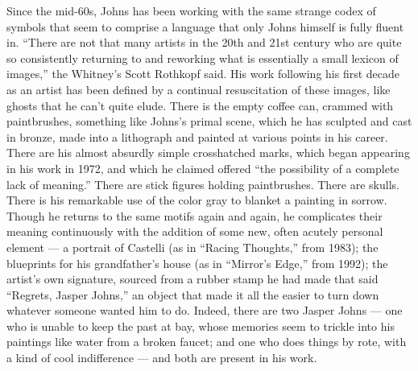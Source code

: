 Since the mid-60s, Johns has been working with the same strange codex of
symbols that seem to comprise a language that only Johns himself is
fully fluent in. ``There are not that many artists in the 20th and 21st
century who are quite so consistently returning to and reworking what is
essentially a small lexicon of images,'' the Whitney's Scott Rothkopf
said. His work following his first decade as an artist has been defined
by a continual resuscitation of these images, like ghosts that he can't
quite elude. There is the empty coffee can, crammed with paintbrushes,
something like Johns's primal scene, which he has sculpted and cast in
bronze, made into a lithograph and painted at various points in his
career. There are his almost absurdly simple crosshatched marks, which
began appearing in his work in 1972, and which he claimed offered ``the
possibility of a complete lack of meaning.'' There are stick figures
holding paintbrushes. There are skulls. There is his remarkable use of
the color gray to blanket a painting in sorrow. Though he returns to the
same motifs again and again, he complicates their meaning continuously
with the addition of some new, often acutely personal element --- a
portrait of Castelli (as in ``Racing Thoughts,'' from 1983); the
blueprints for his grandfather's house (as in ``Mirror's Edge,'' from
1992); the artist's own signature, sourced from a rubber stamp he had
made that said ``Regrets, Jasper Johns,'' an object that made it all the
easier to turn down whatever someone wanted him to do. Indeed, there are
two Jasper Johns --- one who is unable to keep the past at bay, whose
memories seem to trickle into his paintings like water from a broken
faucet; and one who does things by rote, with a kind of cool
indifference --- and both are present in his work.

